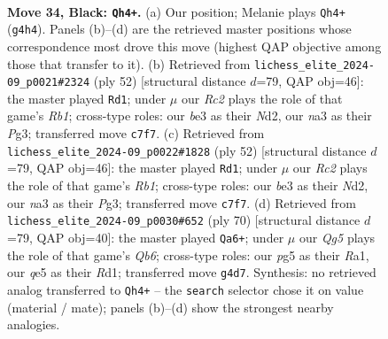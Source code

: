 \documentclass[11pt]{article}
\begin{document}
\clearpage

\begin{figure}[p]\centering
\begin{subfigure}{0.46\textwidth}\centering
\resizebox{\linewidth}{!}{%
\newchessgame
\chessboard[
  setfen={6nr/1kr3p1/8/2p1Q1Pp/2P2Pq1/N3B3/PP5K/1R6 b - - 6 34},
  showmover=false,
  pgfstyle=straightmove, color=movearrow, markmove={g4-h4}
]}
\caption{}
\end{subfigure}\hfill
\begin{subfigure}{0.46\textwidth}\centering
\resizebox{\linewidth}{!}{%
\newchessgame
\chessboard[
  setfen={8/p1knr3/5p2/2pQ4/1pp5/6P1/qP1N1P1P/1R4K1 w - - 0 27},
  showmover=false,
  pgfstyle=straightmove, color=movearrow, markmove={b1-d1}
]}
\caption{}
\end{subfigure}
\\[4pt]
\begin{subfigure}{0.46\textwidth}\centering
\resizebox{\linewidth}{!}{%
\newchessgame
\chessboard[
  setfen={8/p1knr3/5p2/2pQ4/1pp5/6P1/qP1N1P1P/1R4K1 w - - 0 27},
  showmover=false,
  pgfstyle=straightmove, color=movearrow, markmove={b1-d1}
]}
\caption{}
\end{subfigure}\hfill
\begin{subfigure}{0.46\textwidth}\centering
\resizebox{\linewidth}{!}{%
\newchessgame
\chessboard[
  setfen={2kr1b2/5p2/1Q3P2/2Nq4/1p1p4/1Pp2nP1/5P2/R2R3K w - - 5 36},
  showmover=false,
  pgfstyle=straightmove, color=movearrow, markmove={b6-a6}
]}
\caption{}
\end{subfigure}
\caption{\textbf{Move 34, Black: \texttt{Qh4+}.} (a) Our position; Melanie plays \texttt{Qh4+} (\texttt{g4h4}). Panels (b)--(d) are the retrieved master positions whose correspondence most drove this move (highest QAP objective among those that transfer to it). (b) Retrieved from \texttt{lichess\_elite\_2024-09\_p0021\#2324} (ply 52) [structural distance $d$=79, QAP obj=46]: the master played \texttt{Rd1}; under $\mu$ our \emph{Rc2} plays the role of that game's \emph{Rb1}; cross-type roles: our \emph{b}e3 as their \emph{N}d2, our \emph{n}a3 as their \emph{P}g3; transferred move \texttt{c7f7}. (c) Retrieved from \texttt{lichess\_elite\_2024-09\_p0022\#1828} (ply 52) [structural distance $d$=79, QAP obj=46]: the master played \texttt{Rd1}; under $\mu$ our \emph{Rc2} plays the role of that game's \emph{Rb1}; cross-type roles: our \emph{b}e3 as their \emph{N}d2, our \emph{n}a3 as their \emph{P}g3; transferred move \texttt{c7f7}. (d) Retrieved from \texttt{lichess\_elite\_2024-09\_p0030\#652} (ply 70) [structural distance $d$=79, QAP obj=40]: the master played \texttt{Qa6+}; under $\mu$ our \emph{Qg5} plays the role of that game's \emph{Qb6}; cross-type roles: our \emph{p}g5 as their \emph{R}a1, our \emph{q}e5 as their \emph{R}d1; transferred move \texttt{g4d7}. Synthesis: no retrieved analog transferred to \texttt{Qh4+} -- the \texttt{search} selector chose it on value (material / mate); panels (b)--(d) show the strongest nearby analogies.}
\label{fig:thought-m67}
\end{figure}
\end{document}
